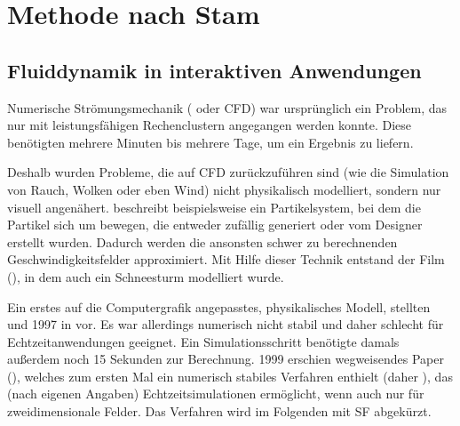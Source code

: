\section{Methode nach Stam}
\label{sec:stam}

\subsection{Fluiddynamik in interaktiven Anwendungen}

Numerische Strömungsmechanik (\Pimiddyengl{} oder CFD) war ursprünglich ein Problem, das nur mit
leistungsfähigen Rechenclustern angegangen werden konnte. Diese
benötigten mehrere Minuten bis mehrere Tage, um ein Ergebnis zu
liefern.

Deshalb wurden Probleme, die auf CFD zurückzuführen sind (wie die
Simulation von Rauch, Wolken oder eben Wind) nicht physikalisch
modelliert, sondern nur visuell
angenähert. \cite{Sims:1990:PAR:97880.97923} beschreibt beispielsweise
ein Partikelsystem, bei dem die Partikel sich um
 bewegen, die entweder zufällig generiert
oder vom Designer erstellt wurden. Dadurch werden die ansonsten schwer
zu berechnenden Geschwindigkeitsfelder approximiert. Mit Hilfe dieser
Technik entstand der Film  (\cite{ParticleDreams}), in dem auch ein Schneesturm modelliert
wurde.

Ein erstes auf die Computergrafik angepasstes, physikalisches Modell,
stellten  und  1997 in \cite{Foster1997} vor. Es war
allerdings numerisch nicht stabil und daher schlecht für
Echtzeitanwendungen geeignet. Ein Simulationsschritt benötigte damals
außerdem noch \Pimiddyca{} 15 Sekunden zur Berechnung. 1999 erschien 
wegweisendes Paper  (\cite{Stam1999}),
welches zum ersten Mal ein numerisch stabiles Verfahren enthielt
(daher ), das (nach eigenen Angaben)
Echtzeitsimulationen ermöglicht, wenn auch nur für zweidimensionale
Felder. Das Verfahren wird im Folgenden mit SF abgekürzt.

